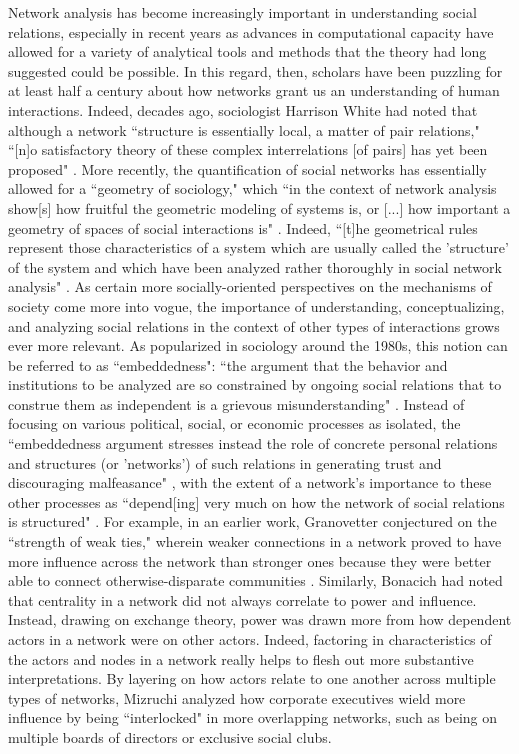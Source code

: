 \documentclass[3p,times]{elsarticle}
\begin{document}
Network analysis has become increasingly important in understanding social relations, especially in recent years as advances in computational capacity have allowed for a variety of analytical tools and methods that the theory had long suggested could be possible. In this regard, then, scholars have been puzzling for at least half a century about how networks grant us an understanding of human interactions. Indeed, decades ago, sociologist Harrison White had noted that although a network ``structure is essentially local, a matter of pair relations," ``[n]o satisfactory theory of these complex interrelations [of pairs] has yet been proposed" \cite[p. 172-173]{white2007catnets}. More recently, the quantification of social networks has essentially allowed for a ``geometry of sociology," which ``in the context of network analysis show[s] how fruitful the geometric modeling of systems is, or [...] how important a geometry of spaces of social interactions is" \cite[p. 218]{kluver2000dynamics}. Indeed, ``[t]he geometrical rules represent those characteristics of a system which are usually called the 'structure' of the system and which have been analyzed rather thoroughly in social network analysis" \cite[p. 102]{kluver2000dynamics}. As certain more socially-oriented perspectives on the mechanisms of society come more into vogue, the importance of understanding, conceptualizing, and analyzing social relations in the context of other types of interactions grows ever more relevant. As popularized in sociology around the 1980s, this notion can be referred to as ``embeddedness": ``the argument that the behavior and institutions to be analyzed are so constrained by ongoing social relations that to construe them as independent is a grievous misunderstanding" \cite[p. 162]{granovetter2007economic}. Instead of focusing on various political, social, or economic processes as isolated, the ``embeddedness argument stresses instead the role of concrete personal relations and structures (or 'networks') of such relations in generating trust and discouraging malfeasance" \cite[p. 167]{granovetter2007economic}, with the extent of a network's importance to these other processes as ``depend[ing] very much on how the network of social relations is structured" \cite[p. 168-169]{granovetter2007economic}. For example, in an earlier work, Granovetter conjectured on the ``strength of weak ties," wherein weaker connections in a network proved to have more influence across the network than stronger ones because they were better able to connect otherwise-disparate communities \cite{granovetter1973strength}. Similarly, Bonacich \cite{bonacich1987power} had noted that centrality in a network did not always correlate to power and influence. Instead, drawing on exchange theory, power was drawn more from how dependent actors in a network were on other actors. Indeed, factoring in characteristics of the actors and nodes in a network really helps to flesh out more substantive interpretations. By layering on how actors relate to one another across multiple types of networks, Mizruchi \cite{mizruchi1996interlocks} analyzed how corporate executives wield more influence by being ``interlocked" in more overlapping networks, such as being on multiple boards of directors or exclusive social clubs.
\end{document}

